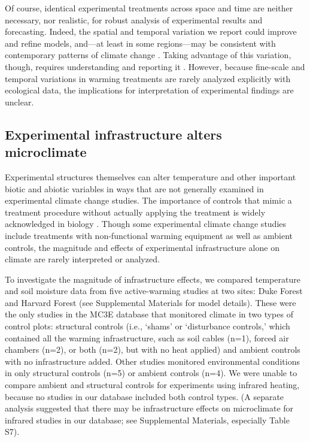 \documentclass{article}
\begin{document}
\par Of course, identical experimental treatments across space and time are neither necessary, nor realistic, for robust analysis of experimental results and forecasting. %
Indeed, the spatial and temporal variation we report could improve and refine models, and---at least in some regions---may be consistent with contemporary patterns of climate change \citep{ipcc2013}. Taking advantage of this variation, though, requires understanding and reporting it \citep[e.g.,][]{milcu2016}. However, because fine-scale and temporal variations in warming treatments are rarely analyzed explicitly with ecological data, the implications for interpretation of experimental findings are unclear.


\subsection* {Experimental infrastructure alters microclimate}
Experimental structures themselves can alter temperature and other important biotic and abiotic variables in ways that are not generally examined in experimental climate change studies. The importance of controls that mimic a treatment procedure without actually applying the treatment is widely acknowledged in biology \citep[e.g.,][]{dayton1971,spector2001,johnson2002,quinn2002}. Though some experimental climate change studies include treatments with non-functional warming equipment as well as ambient controls, the magnitude and effects of experimental infrastructure alone on climate are rarely interpreted or analyzed.
\par To investigate the magnitude of infrastructure effects, we compared temperature and soil moisture data from five active-warming studies at two sites: Duke Forest and Harvard Forest \citep{farnsworth1995,clark2014b, marchin2015, pelini2011}(see Supplemental Materials for model details). These were the only studies in the MC3E database that monitored climate in two types of control plots: structural controls (i.e., `shams' or `disturbance controls,' which contained all the warming infrastructure, such as soil cables (n=1), forced air chambers (n=2), or both (n=2), but with no heat applied) and ambient controls with no infrastructure added. Other studies monitored environmental conditions in only structural controls (n=5) or ambient controls (n=4). We were unable to compare ambient and structural controls for experiments using infrared heating, because no studies in our database included both control types. (A separate analysis suggested that there may be infrastructure effects on microclimate for infrared studies in our database; see Supplemental Materials, especially Table S7). 
\end{document}

